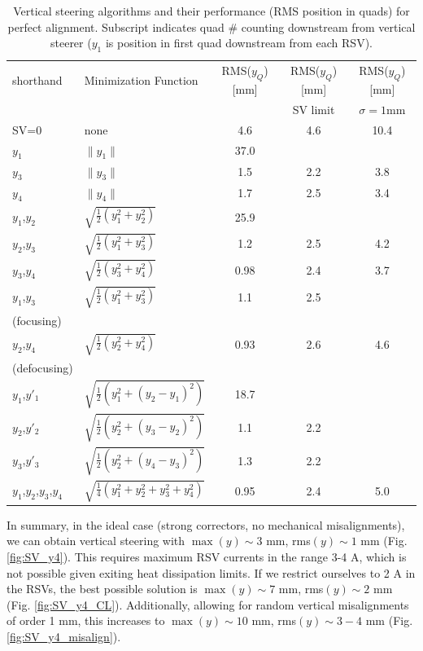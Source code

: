 \begin{table}[!htb]
\centering
\caption{Vertical steering algorithms and their performance (RMS position in quads) for perfect alignment. Subscript indicates quad \# counting downstream from vertical steerer ($y_1$ is position in first quad downstream from each RSV).}
\label{tab:vert_algorithm}
\begin{tabular}{|l|l|c|c|c|}
\hline
shorthand & Minimization Function & RMS($y_Q$) [mm] & RMS($y_Q$) [mm] & RMS($y_Q$) [mm] \\
& & & SV limit & $\sigma = 1$mm \\
\hline
SV=0 & none  & 4.6 & 4.6 & 10.4 \\ \hline
$y_1$& $\| y_1 \|$ & 37.0 & & \\
$y_3$& $\| y_3 \|$ & 1.5& 2.2 & 3.8\\
$y_4$& $\| y_4 \|$ &  1.7& 2.5 & 3.4\\ \hline
$y_1$,$y_2$ & $\sqrt{\frac{1}{2}\left(y_1^2 +y_2^2\right)}$ &  25.9 & & \\
$y_2$,$y_3$ & $\sqrt{\frac{1}{2}\left(y_1^2 +y_3^2\right)}$ &  1.2& 2.5 & 4.2\\
$y_3$,$y_4$ & $\sqrt{\frac{1}{2}\left(y_3^2 +y_4^2\right)}$ &  0.98 & 2.4 & 3.7 \\
$y_1$,$y_3$ & $\sqrt{\frac{1}{2}\left(y_1^2 +y_3^2\right)}$ &  1.1 & 2.5& \\
(focusing) & & & & \\
$y_2$,$y_4$ & $\sqrt{\frac{1}{2}\left(y_2^2 +y_4^2\right)}$ &  0.93 & 2.6& 4.6\\
(defocusing) & & & & \\ \hline 
$y_1$,$y'_1$ & $\sqrt{\frac{1}{2}\left(y_1^2 +(y_2-y_1)^2\right)}$ & 18.7 & & \\
$y_2$,$y'_2$ & $\sqrt{\frac{1}{2}\left(y_2^2 +(y_3-y_2)^2\right)}$ & 1.1 & 2.2& \\
$y_3$,$y'_3$ & $\sqrt{\frac{1}{2}\left(y_2^2 +(y_4-y_3)^2\right)}$ & 1.3 & 2.2& \\
$y_1$,$y_2$,$y_3$,$y_4$ &  $\sqrt{\frac{1}{4}\left(y_1^2 +y_2^2+ y_3^2 +y_4^2\right)}$ & 0.95 & 2.4 & 5.0\\
\hline
\end{tabular}
\end{table}

In summary, in the ideal case (strong correctors, no mechanical misalignments), we can obtain vertical steering with $\max{(y)} \sim 3$ mm, rms$(y) \sim 1$ mm (Fig. \ref{fig:SV_y4}). This requires maximum RSV currents in the range 3-4 A, which is not possible given exiting heat dissipation limits.  If we restrict ourselves to 2 A in the RSVs, the best possible solution is $\max{(y)} \sim 7$ mm, rms$(y) \sim 2$ mm (Fig. \ref{fig:SV_y4_CL}). Additionally, allowing for random vertical misalignments of order 1 mm, this increases to $\max{(y)} \sim 10$ mm, rms$(y) \sim 3-4$ mm (Fig. \ref{fig:SV_y4_misalign}).

